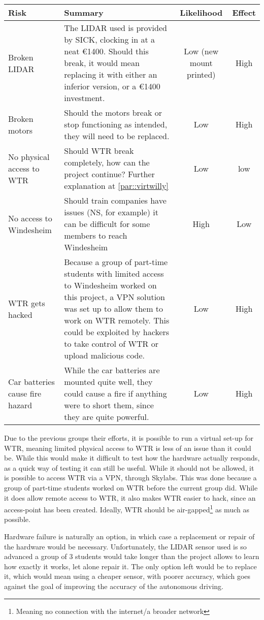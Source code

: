 \begin{tabular}{|L{3cm}|L{6cm}|c|c|}
\hline
Risk			 	& Summary			& Likelihood 		& Effect \\ \hline
Broken LIDAR 	& The LIDAR used is provided by SICK, clocking in at a neat \euro 1400. Should this break, it would mean replacing it with either an inferior version, or a \euro 1400 investment. & Low (new mount printed) & High \\ \hline
Broken motors 	& Should the motors break or stop functioning as intended, they will need to be replaced. & Low & High \\ \hline
No physical access to WTR & Should WTR break completely, how can the project continue? Further explanation at \ref{par::virtwilly} & Low & low \\ \hline
No access to Windesheim & Should train companies have issues (NS, for example) it can be difficult for some members to reach Windesheim & 
High & Low \\ \hline
WTR gets hacked  & Because a group of part-time students with limited access to Windesheim worked on this project, a VPN solution was set up to allow them to work on WTR remotely. This could be exploited by hackers to take control of WTR or upload malicious code. & Low  & High \\ \hline
Car batteries cause fire hazard & While the car batteries are mounted quite well, they could cause a fire if anything were to short them, since they are quite powerful. & Low & High \\ \hline

\end{tabular}

Due to the previous groups their efforts, it is possible to run a virtual set-up for WTR, meaning limited physical access to WTR is less of an issue than it could be\label{par::virtwilly}.
While this would make it difficult to test how the hardware actually responds, as a quick way of testing it can still be useful.
While it should not be allowed, it is possible to access WTR via a VPN, through Skylabs.
This was done because a group of part-time students worked on WTR before the current group did.
While it does allow remote access to WTR, it also makes WTR easier to hack, since an access-point has been created.
Ideally, WTR should be air-gapped\footnote{Meaning no connection with the internet/a broader network} as much as possible.

Hardware failure is naturally an option, in which case a replacement or repair of the hardware would be necessary.
Unfortunately, the LIDAR sensor used is so advanced a group of 3 students would take longer than the project allows to learn how exactly it works, let alone repair it.
The only option left would be to replace it, which would mean using a cheaper sensor, with poorer accuracy, which goes against the goal of improving the accuracy of the autonomous driving.

